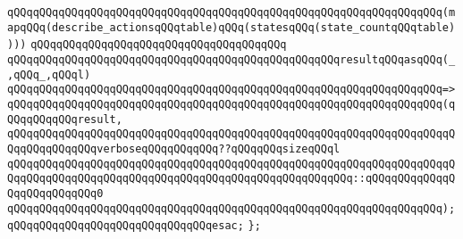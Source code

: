 \verb|qQQqqQQqqQQqqQQqqQQqqQQqqQQqqQQqqQQqqQQqqQQqqQQqqQQqqQQqqQQqqQQqqQQq(mapqQQq(describe_actionsqQQqtable)qQQq(statesqQQq(state_countqQQqtable))))|\newline
\verb|qQQqqQQqqQQqqQQqqQQqqQQqqQQqqQQqqQQqqQQq|\newline
\verb|qQQqqQQqqQQqqQQqqQQqqQQqqQQqqQQqqQQqqQQqqQQqqQQqqQQqresultqQQqasqQQq(_,qQQq_,qQQql)|\newline
\verb|qQQqqQQqqQQqqQQqqQQqqQQqqQQqqQQqqQQqqQQqqQQqqQQqqQQqqQQqqQQqqQQqqQQq=>|\newline
\verb|qQQqqQQqqQQqqQQqqQQqqQQqqQQqqQQqqQQqqQQqqQQqqQQqqQQqqQQqqQQqqQQqqQQq(qQQqqQQqqQQqresult,|\newline
\newline
\verb|qQQqqQQqqQQqqQQqqQQqqQQqqQQqqQQqqQQqqQQqqQQqqQQqqQQqqQQqqQQqqQQqqQQqqQQqqQQqqQQqqQQqverboseqQQqqQQqqQQq??qQQqqQQqsizeqQQql|\newline
\verb|qQQqqQQqqQQqqQQqqQQqqQQqqQQqqQQqqQQqqQQqqQQqqQQqqQQqqQQqqQQqqQQqqQQqqQQqqQQqqQQqqQQqqQQqqQQqqQQqqQQqqQQqqQQqqQQqqQQqqQQqqQQq::qQQqqQQqqQQqqQQqqQQqqQQqqQQq0|\newline
\verb|qQQqqQQqqQQqqQQqqQQqqQQqqQQqqQQqqQQqqQQqqQQqqQQqqQQqqQQqqQQqqQQqqQQq);|\newline
\verb|qQQqqQQqqQQqqQQqqQQqqQQqqQQqqQQqesac;|\newline
\verb|};|\newline

